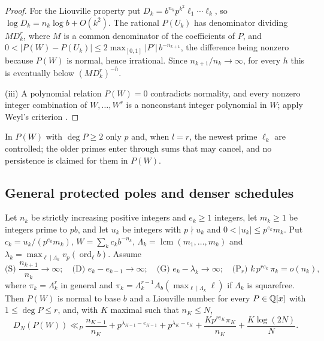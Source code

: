 \documentclass[11pt]{article}
\DeclareMathOperator{\ord}{ord}
\DeclareMathOperator{\lcm}{lcm}
\begin{document}
\begin{proof}
For the Liouville property put $D_k=b^{n_k}p^{k^2}\ell_1\cdots\ell_k$, so $\log D_k=n_k\log b+O(k^2)$. The rational $P(U_k)$ has
denominator dividing $MD_k^r$, where $M$ is a common denominator of the coefficients of $P$, and
$0<|P(W)-P(U_k)|\le2\max_{[0,1]}|P'|\,b^{-n_{k+1}}$, the difference being nonzero because $P(W)$ is normal, hence
irrational. Since $n_{k+1}/n_k\to\infty$, for every $h$ this is eventually below $(MD_k^r)^{-h}$.

(iii) A polynomial relation $P(W)=0$ contradicts normality, and every nonzero integer combination of $W,\ldots,W^r$ is a
nonconstant integer polynomial in $W$; apply Weyl's criterion \cite[Chapter~1, Theorem~6.2]{KN}.
\end{proof}

In $P(W)$ with $\deg P\ge2$ only $p$ and, when $l=r$, the newest prime $\ell_k$ are controlled; the older primes enter
through sums that may cancel, and no persistence is claimed for them in $P(W)$.

\subsection{General protected poles and denser schedules}

\begin{theorem}\label{thm:protected}
Let $n_k$ be strictly increasing positive integers and $e_k\ge1$ integers, let $m_k\ge1$ be integers prime to $pb$, and
let $u_k$ be integers with $p\nmid u_k$ and $0<|u_k|\le p^{e_k}m_k$. Put $c_k=u_k/(p^{e_k}m_k)$, $W=\sum_kc_kb^{-n_k}$,
$\Lambda_k=\lcm(m_1,\ldots,m_k)$ and $\lambda_k=\max_{\ell\mid\Lambda_k}v_p(\ord_\ell b)$. Assume
\[
\text{(S) }\frac{n_{k+1}}{n_k}\to\infty;\quad \text{(D) }e_k-e_{k-1}\to\infty;\quad
\text{(G) }e_k-\lambda_k\to\infty;\quad \text{(P$_r$) }k\,p^{re_k}\,\pi_k=o(n_k),
\]
where $\pi_k=\Lambda_k^r$ in general and $\pi_k=\Lambda_k^{r-1}A_b(\max_{\ell\mid\Lambda_k}\ell)$ if $\Lambda_k$ is squarefree. Then $P(W)$ is
normal to base $b$ and a Liouville number for every $P\in\mathbb Q[x]$ with $1\le\deg P\le r$, and, with $K$ maximal such that
$n_K\le N$,
\[
D_N(P(W))\ll_P\frac{n_{K-1}}{n_K}+p^{\lambda_{K-1}-e_{K-1}}+p^{\lambda_K-e_K}+\frac{Kp^{re_K}\pi_K}{n_K}+\frac{K\log(2N)}N .
\]
\end{theorem}
\end{document}
